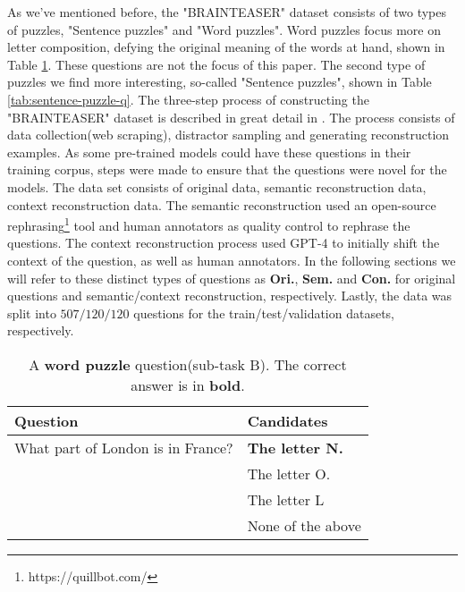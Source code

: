   As we've mentioned before, the "BRAINTEASER" dataset consists of two types of puzzles, "Sentence puzzles"
and "Word puzzles".  Word puzzles focus more on letter composition, defying the original meaning
of the words at hand, shown in Table \ref{tab:word-puzzle-q}. These questions are not the focus of this paper.
The second type of puzzles we find more interesting, so-called "Sentence puzzles", shown in Table
\ref{tab:sentence-puzzle-q}. The three-step process of constructing the "BRAINTEASER" dataset
is described in great detail in \citep{semeval}. The process consists of data collection(web scraping),
distractor sampling and generating reconstruction examples. As some pre-trained models could have
these questions in their training corpus, steps were made to ensure that the questions were novel
for the models.  The data set consists of original data, semantic reconstruction data, context
reconstruction data. The semantic reconstruction used an open-source rephrasing\footnote[3]{https://quillbot.com/} tool and 
human annotators as quality control to rephrase the questions. The context reconstruction process
used GPT-4 to initially shift the context of the question, as well as human annotators. In the 
following sections we will refer to these distinct types of questions as \textbf{Ori.},
\textbf{Sem.} and 
\textbf{Con.} for original questions and semantic/context reconstruction, respectively. Lastly, the
data was split into $507/120/120$ questions for the train/test/validation datasets, respectively.

\begin{table}
	\caption{A \textbf{word puzzle} question(sub-task B). The correct answer is in \textbf{bold}.}
	\label{tab:word-puzzle-q}
	\begin{center}
		\begin{tabular}{|p{3cm}|p{3cm}|}
			\toprule
			Question                          & Candidates             \\
			\midrule
			What part of London is in France? & \textbf{The letter N.} \\
			                                  & The letter O.          \\
			                                  & The letter L           \\
			                                  & None of the above      \\
			\bottomrule
		\end{tabular}
	\end{center}
\end{table}





